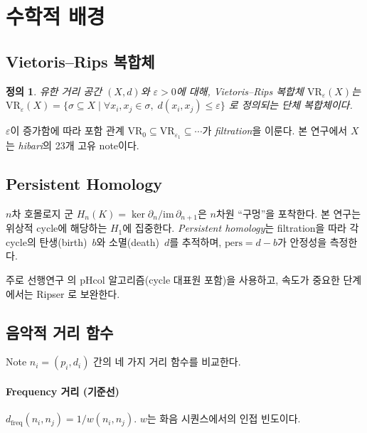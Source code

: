 \documentclass[conference,10pt,a4paper]{IEEEtran}
\newtheorem{definition}{정의}
\begin{document}
\section{수학적 배경}
\label{sec:background}

\subsection{Vietoris--Rips 복합체}
\label{subsec:vr}

\begin{definition}
유한 거리 공간 $(X, d)$와 $\varepsilon > 0$에 대해,
\emph{Vietoris--Rips 복합체} $\mathrm{VR}_\varepsilon(X)$는
$\mathrm{VR}_\varepsilon(X) = \{\sigma \subseteq X \mid
\forall x_i, x_j \in \sigma,\; d(x_i,x_j) \le \varepsilon\}$
로 정의되는 단체 복합체이다.
\end{definition}

$\varepsilon$이 증가함에 따라 포함 관계
$\mathrm{VR}_0 \subseteq \mathrm{VR}_{\varepsilon_1} \subseteq \cdots$가
\emph{filtration}을 이룬다. 본 연구에서 $X$는 \emph{hibari}의
23개 고유 note이다.

\subsection{Persistent Homology}
\label{subsec:ph}

$n$차 호몰로지 군 $H_n(K) = \ker\partial_n / \mathrm{im}\,\partial_{n+1}$은
$n$차원 ``구멍''을 포착한다. 본 연구는 위상적 cycle에 해당하는
$H_1$에 집중한다. \emph{Persistent homology}는 filtration을 따라
각 cycle의 탄생(birth)~$b$와 소멸(death)~$d$를 추적하며,
$\mathrm{pers} = d - b$가 안정성을 측정한다.

주로 선행연구 \cite{tran2021,lee2024}의 pHcol 알고리즘(cycle 대표원
포함)을 사용하고, 속도가 중요한 단계에서는 Ripser \cite{bauer2021}로
보완한다.

\subsection{음악적 거리 함수}
\label{subsec:distances}

Note $n_i = (p_i, d_i)$ 간의 네 가지 거리 함수를 비교한다.

\paragraph{Frequency 거리 (기준선)}
$d_{\mathrm{freq}}(n_i, n_j) = 1/w(n_i, n_j)$. $w$는 화음 시퀀스에서의
인접 빈도이다.
\end{document}
